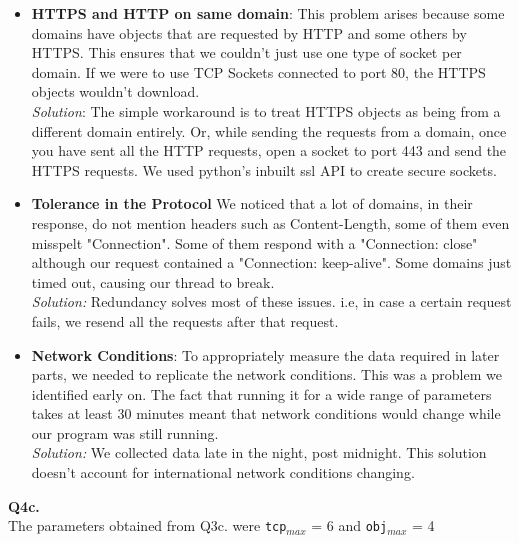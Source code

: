 \documentclass[12pt]{article}
\begin{document}
\begin{itemize}
\item \textbf{HTTPS and HTTP on same domain}: This problem arises because some domains have objects that are requested by HTTP and some others by HTTPS. This ensures that we couldn't just use one type of socket per domain. If we were to use TCP Sockets connected to port 80, the HTTPS objects wouldn't download.\\
\textit{Solution}: The simple workaround is to treat HTTPS objects as being from a different domain entirely. Or, while sending the requests from a domain, once you have sent all the HTTP requests, open a socket to port 443 and send the HTTPS requests. We used python's inbuilt ssl API to create secure sockets.
\item \textbf{Tolerance in the Protocol} We noticed that a lot of domains, in their response, do not mention headers such as Content-Length, some of them even misspelt "Connection". Some of them respond with a "Connection: close" although our request contained a "Connection: keep-alive". Some domains just timed out, causing our thread to break.
\\\textit{Solution:} Redundancy solves most of these issues. i.e, in case a certain request fails, we resend all the requests after that request.
\item \textbf{Network Conditions}: To appropriately measure the data required in later parts, we needed to replicate the network conditions. This was a problem we identified early on. The fact that running it for a wide range of parameters takes at least 30 minutes meant that network conditions would change while our program was still running. \\
\textit{Solution:} We collected data late in the night, post midnight. This solution doesn't account for international network conditions changing.
\end{itemize}
{\bfseries Q4c.}
\\The parameters obtained from Q3c. were \texttt{tcp$_{max}$} = 6 and \texttt{obj$_{max}$} = 4
\end{document}
